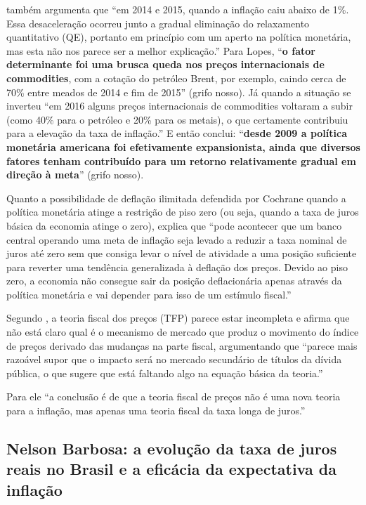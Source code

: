 \documentclass[
	10pt,				%
	openright,			%
	twoside,			%
	a5paper,			%
	english,			%
	french,				%
	spanish,			%
	brazil				%
	]{abntex2}
\begin{document}
 também argumenta que ``em 2014 e 2015, quando a
inflação caiu abaixo de 1\%. Essa desaceleração ocorreu junto a gradual
eliminação do relaxamento quantitativo (QE), portanto em princípio com
um aperto na política monetária, mas esta não nos parece ser a melhor
explicação.'' Para Lopes, ``\textbf{o fator determinante foi uma brusca
queda nos preços internacionais de commodities}, com a cotação do
petróleo Brent, por exemplo, caindo cerca de 70\% entre meados de 2014 e
fim de 2015'' (grifo nosso). Já quando a situação se inverteu ``em 2016
alguns preços internacionais de commodities voltaram a subir (como 40\%
para o petróleo e 20\% para os metais), o que certamente contribuiu para
a elevação da taxa de inflação.'' E então conclui: ``\textbf{desde 2009
a política monetária americana foi efetivamente expansionista, ainda que
diversos fatores tenham contribuído para um retorno relativamente
gradual em direção à meta}'' (grifo nosso).

Quanto a possibilidade de deflação ilimitada defendida por Cochrane
quando a política monetária atinge a restrição de piso zero (ou seja,
quando a taxa de juros básica da economia atinge o zero),
 explica que ``pode acontecer que um banco
central operando uma meta de inflação seja levado a reduzir a taxa
nominal de juros até zero sem que consiga levar o nível de atividade a
uma posição suficiente para reverter uma tendência generalizada à
deflação dos preços. Devido ao piso zero, a economia não consegue sair
da posição deflacionária apenas através da política monetária e vai
depender para isso de um estímulo fiscal.''

Segundo  , a teoria fiscal dos preços (TFP)
parece estar incompleta e afirma que não está claro qual é o mecanismo
de mercado que produz o movimento do índice de preços derivado das
mudanças na parte fiscal, argumentando que ``parece mais razoável supor
que o impacto será no mercado secundário de títulos da dívida pública, o
que sugere que está faltando algo na equação básica da teoria.''

Para ele ``a conclusão é de que a teoria fiscal de preços não é uma nova
teoria para a inflação, mas apenas uma teoria fiscal da taxa longa de
juros.''

\subsection{Nelson Barbosa: a evolução da taxa de juros reais no Brasil
e a eficácia da expectativa da
inflação}\label{nelson-barbosa-a-evoluuxe7uxe3o-da-taxa-de-juros-reais-no-brasil-e-a-eficuxe1cia-da-expectativa-da-inflauxe7uxe3o}
\end{document}
